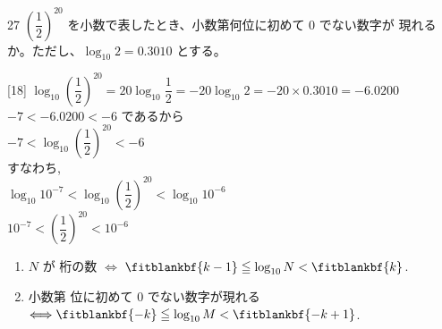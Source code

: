 \documentclass[14pt,dvipdfmx]{jsarticle}
\begin{document}
\vspace{1em}
\begin{practiceprob}{27}
  $\left(\dfrac{1}{2}\right)^{20}$ を小数で表したとき、小数第何位に初めて $0$ でない数字が
  現れるか。ただし、$\log_{10} 2 = 0.3010$ とする。
\end{practiceprob}

\begin{answerbox}{}[18]
  $\log_{10}\!\left(\dfrac{1}{2}\right)^{20}
    = 20\log_{10}\dfrac{1}{2}
    = -20\log_{10} 2
    = -20 \times 0.3010 = -6.0200$\\
  $-7 < -6.0200 < -6$ であるから\\
  $-7 < \log_{10}\!\left(\dfrac{1}{2}\right)^{20} < -6$\\
  \vspace{0.45em}
  すなわち,\\
  \vspace{0.45em}
  $\log_{10} 10^{-7} < \log_{10}\!\left(\dfrac{1}{2}\right)^{20} < \log_{10} 10^{-6}$\\
  $10^{-7} < \left(\dfrac{1}{2}\right)^{20} < 10^{-6}$\\
\end{answerbox}

\vspace{0.15em}
\begin{summarybox}
  \begin{enumerate}[label=\textbf{\arabic*}, leftmargin=1.5zw, itemsep=0.08em]
    \item $N$ が  桁の数 $\Longleftrightarrow$
      $\fitblankbf{k-1} \leqq \log_{10} N < \fitblankbf{k}$.
    \item 小数第  位に初めて $0$ でない数字が現れる \\
      \qquad \qquad \qquad $\Longleftrightarrow \fitblankbf{-k} \leqq \log_{10} M < \fitblankbf{-k+1}$.
  \end{enumerate}
\end{summarybox}
\end{document}
